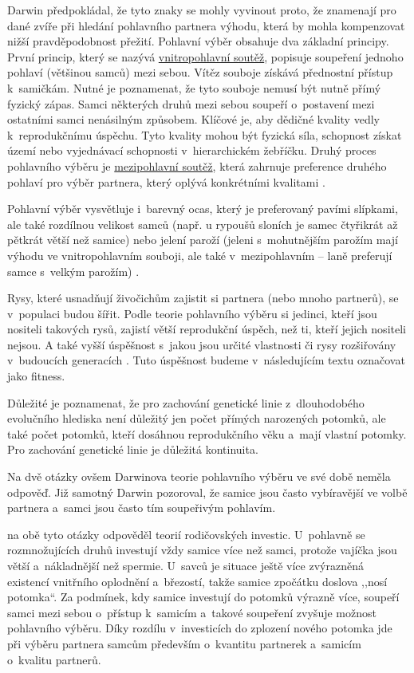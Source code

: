 \documentclass[a4paper, 12pt, notitlepage, oneside, numbers=noenddot]{report}
\begin{document}
Darwin předpokládal, že tyto znaky se mohly vyvinout proto, že
znamenají pro dané zvíře při hledání pohlavního partnera výhodu, která
by mohla kompenzovat nižší pravděpodobnost přežití.  Pohlavní výběr
obsahuje dva základní principy.  První princip, který se nazývá
\underline{vnitropohlavní soutěž}, popisuje soupeření jednoho pohlaví
(většinou samců) mezi sebou.  Vítěz souboje získává přednostní přístup
k~samičkám.  Nutné je poznamenat, že tyto souboje nemusí být nutně
přímý fyzický zápas.  Samci některých druhů mezi sebou soupeří
o~postavení mezi ostatními samci nenásilným způsobem.  Klíčové je, aby
dědičné kvality vedly k~reprodukčnímu úspěchu.  Tyto kvality mohou být
fyzická síla, schopnost získat území nebo vyjednávací schopnosti
v~hierarchickém žebříčku.  Druhý proces pohlavního výběru je
\underline{mezipohlavní soutěž}, která zahrnuje preference druhého
po\-hla\-ví pro výběr partnera, který oplývá konkrétními kvalitami
\citep{Buss2007}.

Pohlavní výběr vysvětluje i~barevný ocas, který je preferovaný pavími
slípkami, ale také rozdílnou velikost samců (např. u rypoušů sloních
je samec čtyřikrát až pětkrát větší než samice) nebo jelení paroží
(jeleni s~mohutnějším parožím mají výhodu ve vnitropohlavním souboji,
ale také v~mezipohlavním -- laně preferují samce s~velkým parožím)
\citep{Buss2007}.

Rysy, které usnadňují živočichům zajistit si partnera (nebo mnoho
partnerů), se v~po\-pu\-laci budou šířit.  Podle teorie pohlavního
výběru si jedinci, kteří jsou nositeli takových rysů, zajistí větší
reprodukční úspěch, než ti, kteří jejich nositeli nejsou.  A také
vyšší úspěšnost s~jakou jsou určité vlastnosti či rysy rozšiřovány
v~budoucích generacích \citep{BarrettDunbarLycett2007}.  Tuto
úspěšnost budeme v~následujícím textu označovat jako fitness.

Důležité je poznamenat, že pro zachování genetické linie
z~dlouhodobého evolučního hlediska není důležitý jen počet přímých
narozených potomků, ale také počet potomků, kteří dosáhnou
reprodukčního věku a~mají vlastní potomky. Pro zachování genetické
linie je důležitá kontinuita.

Na dvě otázky ovšem Darwinova teorie pohlavního výběru ve své době
neměla odpověď.  Již samotný Darwin pozoroval, že samice jsou často
vybíravější ve volbě partnera a~samci jsou často tím soupeřivým
pohlavím.

\citet{Trivers1972} na obě tyto otázky odpověděl teorií rodičovských
investic.  U~pohlavně se rozmnožujících druhů investují vždy samice
více než samci, protože vajíčka jsou větší a~nákladnější než spermie.
U~savců je situace ještě více zvýrazněná existencí vnitřního oplodnění
a~březostí, takže samice zpočátku doslova ,,nosí potomka``.  Za podmínek,
kdy samice investují do potomků výrazně více, soupeří samci mezi sebou
o~přístup k~samicím a~takové soupeření zvyšuje možnost pohlavního
výběru.  Díky rozdílu v~investicích do zplození nového potomka jde při
výběru partnera samcům především o~kvantitu partnerek a~samicím
o~kvalitu partnerů.
\end{document}
